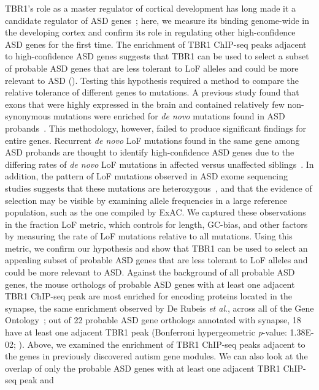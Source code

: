 TBR1's role as a master regulator of cortical development has long made
it a candidate regulator of ASD genes~\citep{Bedogni:2010ew, Chuang:2015dw}; here, we measure its binding genome-wide in the developing
cortex and confirm its role in regulating other high-confidence ASD
genes for the first time. The enrichment of TBR1 ChIP-seq peaks adjacent
to high-confidence ASD genes suggests that TBR1 can be used to select a
subset of probable ASD genes that are less tolerant to LoF alleles and
could be more relevant to ASD (). Testing this hypothesis
required a method to compare the relative tolerance of different genes
to mutations. A previous study found that exons that were highly
expressed in the brain and contained relatively few non-synonymous
mutations were enriched for \emph{de novo} mutations found in ASD
probands~\citep{Uddin:2014dg}. This methodology, however, failed to
produce significant findings for entire genes. Recurrent \emph{de novo}
LoF mutations found in the same gene among ASD probands are thought to
identify high-confidence ASD genes due to the differing rates of
\emph{de novo} LoF mutations in affected versus unaffected siblings~\citep{Iossifov:2014if}. In addition, the pattern of LoF mutations
observed in ASD exome sequencing studies suggests that these mutations
are heterozygous~\citep{Iossifov:2014if}, and that the evidence of
selection may be visible by examining allele frequencies in a large
reference population, such as the one compiled by ExAC. We captured
these observations in the fraction LoF metric, which controls for
length, GC-bias, and other factors by measuring the rate of LoF
mutations relative to all mutations. Using this metric, we confirm our
hypothesis and show that TBR1 can be used to select an appealing subset
of probable ASD genes that are less tolerant to LoF alleles and could be
more relevant to ASD. Against the background of all probable ASD genes,
the mouse orthologs of probable ASD genes with at least one adjacent
TBR1 ChIP-seq peak are most enriched for encoding proteins located in
the synapse, the same enrichment observed by De Rubeis \emph{et al}.,
across all of the Gene Ontology~\citep{GeneOntologyConsortium:2015fz}; out
of 22 probable ASD gene orthologs annotated with synapse, 18 have at
least one adjacent TBR1 peak (Bonferroni hypergeometric \emph{p}-value:
1.38E-02; ). Above, we examined the enrichment of
TBR1 ChIP-seq peaks adjacent to the genes in previously discovered
autism gene modules. We can also look at the overlap of only the
probable ASD genes with at least one adjacent TBR1 ChIP-seq peak and
